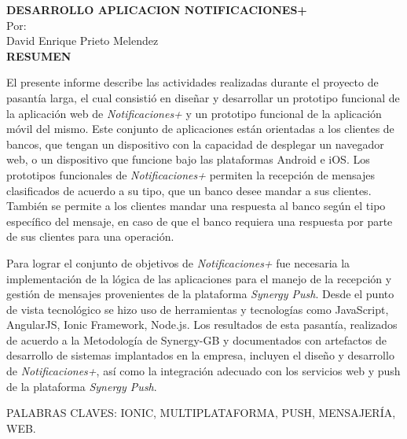 \setcounter{page}{4}
\begin{center}

{\bfseries DESARROLLO APLICACION NOTIFICACIONES+\\}
\bigskip
Por: \\ David Enrique Prieto Melendez\\
\bigskip
\bigskip
{\bf RESUMEN}  %
\end{center}	

El presente informe describe las actividades realizadas durante el proyecto de pasantía larga, el cual consistió en diseñar y desarrollar un prototipo funcional de la aplicación web de \textit{Notificaciones+} y un prototipo funcional de la aplicación móvil del mismo. Este conjunto de aplicaciones están orientadas a los clientes de bancos, que tengan un dispositivo con la capacidad de desplegar un navegador web, o un dispositivo que funcione bajo las plataformas Android e iOS. Los prototipos funcionales de \textit{Notificaciones+} permiten la recepción de mensajes clasificados de acuerdo a su tipo, que un banco desee mandar a sus clientes. También se permite a los clientes mandar una respuesta al banco según el tipo específico del mensaje, en caso de que el banco requiera una respuesta por parte de sus clientes para una operación.


Para lograr el conjunto de objetivos de \textit{Notificaciones+} fue necesaria la implementación de la lógica de las aplicaciones para el manejo de la recepción y gestión de mensajes provenientes de la plataforma \textit{Synergy Push}. Desde el punto de vista tecnológico se hizo uso de herramientas y tecnologías como JavaScript, AngularJS, Ionic Framework, Node.js. Los resultados de esta pasantía, realizados de acuerdo a la Metodología de Synergy-GB y documentados con artefactos de desarrollo de sistemas implantados en la empresa, incluyen el diseño y desarrollo de \textit{Notificaciones+}, así como la integración adecuado con los servicios web y push de la plataforma \textit{Synergy Push}.

\bigskip
\noindent
PALABRAS CLAVES: IONIC, MULTIPLATAFORMA, PUSH, MENSAJERÍA, WEB.
